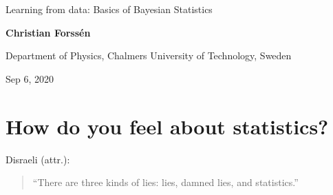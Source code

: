 \documentclass[%
oneside,                 %
final,                   %
10pt]{article}
\newenvironment{block_mdfboxadmon}[1][]{
\begin{block_mdfboxmdframed}[frametitle=#1]
}
{
\end{block_mdfboxmdframed}
}
\begin{document}

\newcommand{\exercisesection}[1]{\subsection*{#1}}







\thispagestyle{empty}

\begin{center}
{\LARGE\bf
\begin{spacing}{1.25}
Learning from data: Basics of Bayesian Statistics
\end{spacing}
}
\end{center}


\begin{center}
{\bf Christian Forssén}
\end{center}

    \begin{center}
\centerline{{\small Department of Physics, Chalmers University of Technology, Sweden}}
\end{center}
    

\begin{center}
Sep 6, 2020
\end{center}

\vspace{1cm}


\section{How do you feel about statistics?}

\begin{block_mdfboxadmon}[]
Disraeli (attr.): 

\begin{quote}
“There are three kinds of lies: lies, damned lies, and statistics.”
\end{quote}
\end{block_mdfboxadmon} %
\end{document}
